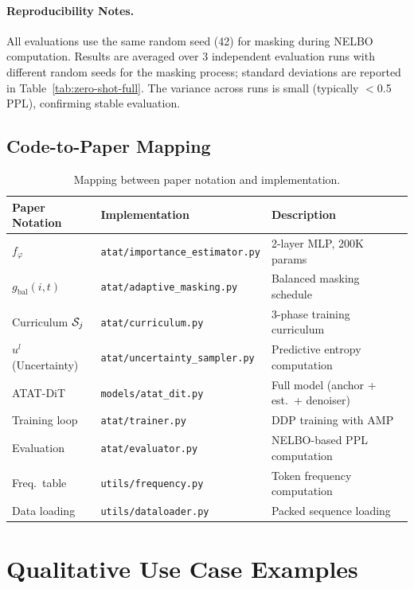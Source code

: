 \paragraph{Reproducibility Notes.} All evaluations use the same random seed (42) for masking during NELBO computation. Results are averaged over 3 independent evaluation runs with different random seeds for the masking process; standard deviations are reported in Table~\ref{tab:zero-shot-full}. The variance across runs is small (typically $<$0.5 PPL), confirming stable evaluation.

\subsection{Code-to-Paper Mapping}

\begin{table}[H]
\centering
\caption{Mapping between paper notation and implementation.}
\label{tab:code-mapping}
\begin{tabular}{lll}
\toprule
\textbf{Paper Notation} & \textbf{Implementation} & \textbf{Description} \\
\midrule
$f_\varphi$ & \texttt{atat/importance\_estimator.py} & 2-layer MLP, 200K params \\
$g_{\text{bal}}(i, t)$ & \texttt{atat/adaptive\_masking.py} & Balanced masking schedule \\
Curriculum $\mathcal{S}_j$ & \texttt{atat/curriculum.py} & 3-phase training curriculum \\
$u^l$ (Uncertainty) & \texttt{atat/uncertainty\_sampler.py} & Predictive entropy computation \\
ATAT-DiT & \texttt{models/atat\_dit.py} & Full model (anchor + est.\ + denoiser) \\
Training loop & \texttt{atat/trainer.py} & DDP training with AMP \\
Evaluation & \texttt{atat/evaluator.py} & NELBO-based PPL computation \\
Freq.\ table & \texttt{utils/frequency.py} & Token frequency computation \\
Data loading & \texttt{utils/dataloader.py} & Packed sequence loading \\
\bottomrule
\end{tabular}
\end{table}

\section{Qualitative Use Case Examples}
\label{app:use-cases}

